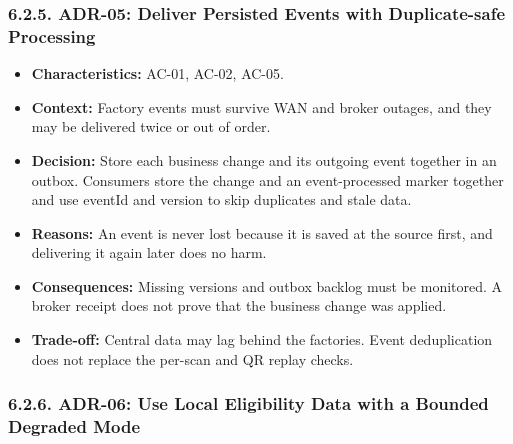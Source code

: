 \subsubsection*{6.2.5. ADR-05: Deliver Persisted Events with Duplicate-safe Processing}

{}

\begin{itemize}[leftmargin=36pt, itemsep=2pt, topsep=4pt, parsep=2pt]
  \item \textbf{Characteristics:} AC-01, AC-02, AC-05.
  \item \textbf{Context:} Factory events must survive WAN and broker outages, and they may be delivered twice or out of order.
  \item \textbf{Decision:} Store each business change and its outgoing event together in an outbox. Consumers store the change and an event-processed marker together and use eventId and version to skip duplicates and stale data.
  \item \textbf{Reasons:} An event is never lost because it is saved at the source first, and delivering it again later does no harm.
  \item \textbf{Consequences:} Missing versions and outbox backlog must be monitored. A broker receipt does not prove that the business change was applied.
  \item \textbf{Trade-off:} Central data may lag behind the factories. Event deduplication does not replace the per-scan and QR replay checks.
\end{itemize}

\subsubsection*{6.2.6. ADR-06: Use Local Eligibility Data with a Bounded Degraded Mode}

{}

